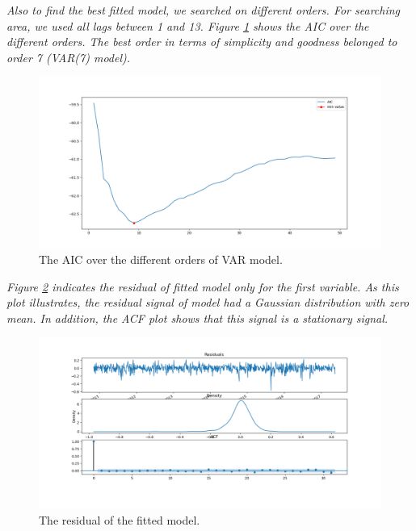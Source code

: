 \textit{Also to find the best fitted model, we searched on different orders. For searching area, we used all lags between 1 and 13. Figure \ref{fig:Ass2_Q4_AIC_plot} shows the \gls{AIC} over the different orders. The best order in terms of simplicity and goodness belonged to order 7 (VAR(7) model). }

\begin{figure}[H]
    \centering
    \begin{minipage}[b]{1\textwidth}
        \includegraphics[width=\textwidth]{manuscript/src/figures/Ass2/Ass2_Q4_AIC_plot.png}
    \end{minipage}
    \caption{The \gls{AIC} over the different orders of VAR model.}
    \label{fig:Ass2_Q4_AIC_plot}
\end{figure}

\textit{Figure \ref{fig:Ass2_Q4_residual_plot} indicates the residual of fitted model only for the first variable. As this plot illustrates, the residual signal of model had a Gaussian distribution with zero mean. In addition, the \gls{ACF} plot shows that this signal is a stationary signal.}



\begin{figure}[H]
    \centering
    \begin{minipage}[b]{1\textwidth}
        \includegraphics[width=\textwidth]{manuscript/src/figures/Ass2/Ass2_Q4_residual_plot.png}
    \end{minipage}
    \caption{The residual of the fitted model.}
    \label{fig:Ass2_Q4_residual_plot}
\end{figure}


